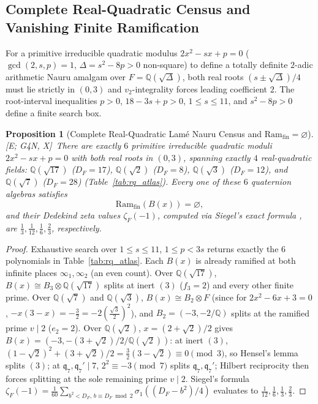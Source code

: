 \documentclass[11pt]{amsart}
\numberwithin{equation}{section}
\theoremstyle{plain}
\newtheorem{proposition}[theorem]{Proposition}
\theoremstyle{definition}\newtheorem{definition}[theorem]{Definition}
\theoremstyle{remark}\newtheorem{remark}[theorem]{Remark}
\newcommand{\Q}{\mathbb{Q}}
\newcommand{\frq}{\mathfrak{q}}
\newcommand{\Ram}{\mathrm{Ram}}
\newcommand{\ctag}[1]{\textup{\textsf{\scriptsize[#1]}}}
\begin{document}
\subsection{Complete Real-Quadratic Census and Vanishing Finite Ramification}\label{sec:rq_census}
For a primitive irreducible quadratic modulus $2x^2 - sx + p = 0$ ($\gcd(2,s,p)=1$, $\Delta = s^2 - 8p > 0$ non-square) to define a totally definite $2$-adic arithmetic Nauru amalgam over $F = \Q(\sqrt{\Delta})$, both real roots $(s\pm\sqrt{\Delta})/4$ must lie strictly in $(0,3)$ and $v_2$-integrality forces leading coefficient $2$. The root-interval inequalities $p > 0$, $18 - 3s + p > 0$, $1\le s\le 11$, and $s^2 - 8p > 0$ define a finite search box.

\begin{proposition}[Complete Real-Quadratic Lam\'e Nauru Census and $\Ram_{\mathrm{fin}}=\varnothing$]\label{prop:rq_census}
\ctag{E; G4N, X}\ There are exactly $6$ primitive irreducible quadratic moduli $2x^2 - sx + p = 0$ with both real roots in $(0,3)$, spanning exactly $4$ real-quadratic fields: $\Q(\sqrt{17})$ ($D_F=17$), $\Q(\sqrt{2})$ ($D_F=8$), $\Q(\sqrt{3})$ ($D_F=12$), and $\Q(\sqrt{7})$ ($D_F=28$) (Table~\ref{tab:rq_atlas}). Every one of these $6$ quaternion algebras satisfies
\begin{equation}\label{eq:ram_fin_empty}
\Ram_{\mathrm{fin}}(B(x)) = \varnothing,
\end{equation}
and their Dedekind zeta values $\zeta_F(-1)$, computed via Siegel's exact formula \cite{siegel1969}, are $\frac{1}{3}, \frac{1}{12}, \frac{1}{6}, \frac{2}{3}$, respectively.
\end{proposition}
\begin{proof}
Exhaustive search over $1\le s\le 11$, $1\le p < 3s$ returns exactly the $6$ polynomials in Table~\ref{tab:rq_atlas}. Each $B(x)$ is already ramified at both infinite places $\infty_1,\infty_2$ (an even count). Over $\Q(\sqrt{17})$, $B(x) \cong B_3\otimes\Q(\sqrt{17})$ splits at inert $(3)$ ($f_3=2$) and every other finite prime. Over $\Q(\sqrt{7})$ and $\Q(\sqrt{3})$, $B(x) \cong B_2\otimes F$ (since for $2x^2-6x+3=0$, $-x(3-x)=-\frac{3}{2}=-2(\frac{\sqrt{3}}{2})^2$), and $B_2=(-3,-2/\Q)$ splits at the ramified prime $v\mid 2$ ($e_2=2$). Over $\Q(\sqrt{2})$, $x=(2+\sqrt{2})/2$ gives $B(x)=(-3,-(3+\sqrt{2})/2/\Q(\sqrt{2}))$: at inert $(3)$, $(1-\sqrt{2})^2 + (3+\sqrt{2})/2 = \frac{3}{2}(3-\sqrt{2}) \equiv 0 \pmod 3$, so Hensel's lemma splits $(3)$; at $\frq_7,\frq_7'\mid 7$, $2^2\equiv -3\pmod 7$ splits $\frq_7,\frq_7'$; Hilbert reciprocity then forces splitting at the sole remaining prime $v\mid 2$. Siegel's formula $\zeta_F(-1)=\frac{1}{60}\sum_{b^2<D_F,\,b\equiv D_F\bmod 2}\sigma_1((D_F-b^2)/4)$ evaluates to $\frac{1}{12},\frac{1}{6},\frac{1}{3},\frac{2}{3}$.
\end{proof}
\end{document}
